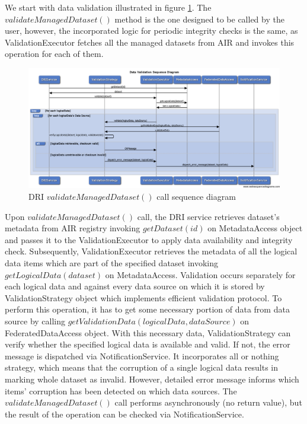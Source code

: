 We start with data validation illustrated in figure
\ref{fig:validation-diagram}. The $validateManagedDataset()$ method is the one
designed to be called by the user, however, the incorporated logic for periodic
integrity checks is the same, as ValidationExecutor fetches all the managed
datasets from AIR and invokes this operation for each of them.\\

\begin{figure}[h!]
	\centering
	\includegraphics[width=\textwidth]{images/validation-diagram.png}
	\caption{DRI $validateManagedDataset()$ call sequence diagram}
	\label{fig:validation-diagram}
\end{figure}

Upon $validateManagedDataset()$ call, the DRI service retrieves dataset's
metadata from AIR registry invoking $getDataset(id)$ on MetadataAccess object
and passes it to the ValidationExecutor to apply data availability and
integrity check. Subsequently, ValidationExecutor retrieves the metadata of
all the logical data items which are part of the specified dataset invoking
$getLogicalData(dataset)$ on MetadataAccess. Validation occurs separately for
each logical data and against every data source on which it is stored by
ValidationStrategy object which implements efficient validation protocol. To
perform this operation, it has to get some necessary portion of data from data
source by calling $getValidationData(logicalData, dataSource)$ on
FederatedDataAccess object. With this necessary data, ValidationStrategy can
verify whether the specified logical data is available and valid. If not, the
error message is dispatched via NotificationService. It incorporates all or
nothing strategy, which means that the corruption of a single logical data
results in marking whole dataset as invalid. However, detailed error message
informs which items' corruption has been detected on which data sources. The
$validateManagedDataset()$ call performs asynchronously (no return value), but
the result of the operation can be checked via NotificationService.\\

